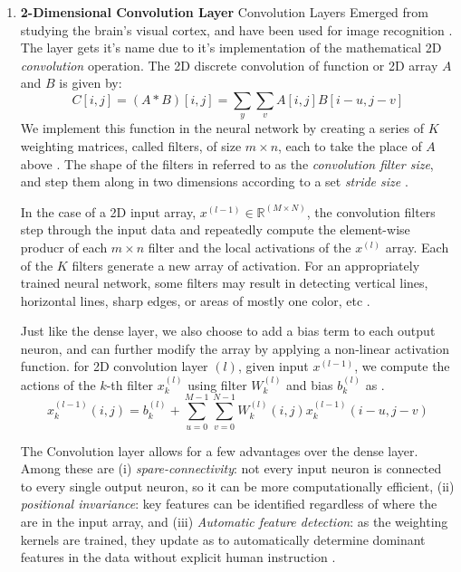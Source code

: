\documentclass[conference,onecolumn,letterpaper]{IEEEtran}
\begin{document}
\begin{enumerate}
\item\textbf{2-Dimensional Convolution Layer}
Convolution Layers Emerged from studying the brain's visual cortex, and have been used for image recognition \cite{Geron,Goodfellow,Loy}. The layer gets it's name due to it's implementation of the mathematical 2D \textit{convolution} operation. The 2D discrete convolution of function or 2D array $A$ and $B$ is given by:
\begin{equation}
\label{eqn:Conv2D}
C[i,j]  = (A * B)[i,j] = \sum_{y}\sum_{v} A[i,j]B[i-u,j-v]
\end{equation} 
We implement this function in the neural network by creating a series of $K$ weighting matrices, called filters, of size $m \times n$, each to take the place of $A$ above \cite{Geron}. The shape of the filters in referred to as the \textit{convolution filter size}, and step them along in two dimensions according to a set \textit{stride size} \cite{Goodfellow,Loy}.

In the case of a 2D input array, $x^{(l-1)} \in \mathbb{R}^{(M \times N)}$, the convolution filters step through the input data and repeatedly compute the element-wise producr of each $m \times n$ filter and the local activations of the $x^{(l)}$ array. Each of the $K$ filters generate a new array of activation. For an appropriately trained neural network, some filters may result in detecting vertical lines, horizontal lines, sharp edges, or areas of mostly one color, etc \cite{Loy}.

Just like the dense layer, we also choose to add a bias term to each output neuron, and can further modify the array by applying a non-linear activation function. for 2D convolution layer $(l)$, given input $x^{(l-1)}$, we compute the actions of the $k$-th filter $x^{(l)}_k$ using filter $W^{(l)}_k$ and bias $b^{(l)}_k$ as \cite{Goodfellow}.
\begin{equation}
\label{eqn:Conv2DCall}
x^{(l-1)}_{k}(i,j) = b^{(l)}_{k} + 
\sum_{u=0}^{M-1}\sum_{v=0}^{N-1} W^{(l)}_{k}(i,j) x^{(l-1)}_{k}(i-u,j-v)
\end{equation}

The Convolution layer allows for a few advantages over the dense layer. Among these are (i) \textit{spare-connectivity}: not every input neuron is connected to every single output neuron, so it can be more computationally efficient, (ii) \textit{positional invariance}: key features can be identified regardless of where the are in the input array, and (iii) \textit{Automatic feature detection}: as the weighting kernels are trained, they update as to automatically determine dominant features in the data without explicit human instruction \cite{Geron,Goodfellow,Loy}.


\end{enumerate}
\end{document}
